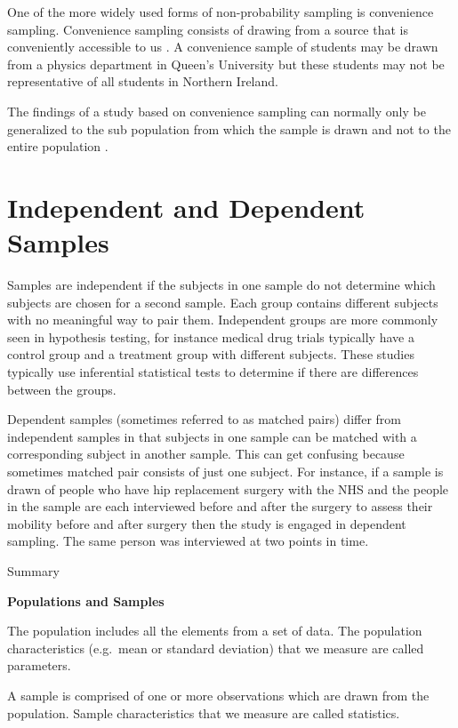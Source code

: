 \documentclass[
]{book}
\begin{document}
One of the more widely used forms of non-probability sampling is convenience sampling. Convenience sampling consists of drawing from a source that is conveniently accessible to us \citep{andrade}. A convenience sample of students may be drawn from a physics department in Queen's University but these students may not be representative of all students in Northern Ireland.

The findings of a study based on convenience sampling can normally only be generalized to the sub population from which the sample is drawn and not to the entire population \citep{andrade}.

\hypertarget{independent-and-dependent-samples}{%
\section{Independent and Dependent Samples}\label{independent-and-dependent-samples}}

Samples are independent if the subjects in one sample do not determine which subjects are chosen for a second sample. Each group contains different subjects with no meaningful way to pair them. Independent groups are more commonly seen in hypothesis testing, for instance medical drug trials typically have a control group and a treatment group with different subjects. These studies typically use inferential statistical tests to determine if there are differences between the groups.

Dependent samples (sometimes referred to as matched pairs) differ from independent samples in that subjects in one sample can be matched with a corresponding subject in another sample. This can get confusing because sometimes matched pair consists of just one subject. For instance, if a sample is drawn of people who have hip replacement surgery with the NHS and the people in the sample are each interviewed before and after the surgery to assess their mobility before and after surgery then the study is engaged in dependent sampling. The same person was interviewed at two points in time.

Summary

\textbf{Populations and Samples}

The population includes all the elements from a set of data. The population characteristics (e.g.~mean or standard deviation) that we measure are called parameters.

A sample is comprised of one or more observations which are drawn from the population. Sample characteristics that we measure are called statistics.
\end{document}
